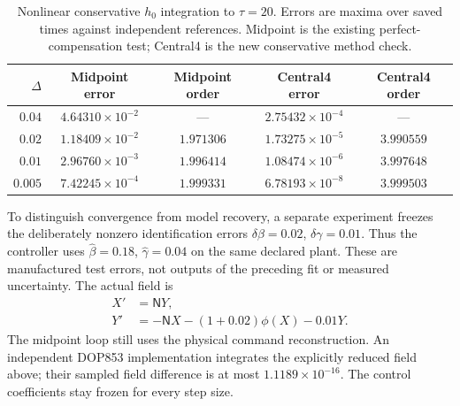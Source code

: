 \begin{table}[t]
\centering
\caption{Nonlinear conservative $h_0$ integration to $\tau=20$. Errors are maxima over saved times against independent references. Midpoint is the existing perfect-compensation test; Central4 is the new conservative method check.}
\label{num:nonlinear-order}
\begin{tabular}{rcccc}
\toprule
$\Delta$ & Midpoint error & Midpoint order & Central4 error & Central4 order\\
\midrule
$0.04$ & $4.64310\times10^{-2}$ & --- & $2.75432\times10^{-4}$ & --- \\
$0.02$ & $1.18409\times10^{-2}$ & $1.971306$ & $1.73275\times10^{-5}$ & $3.990559$ \\
$0.01$ & $2.96760\times10^{-3}$ & $1.996414$ & $1.08474\times10^{-6}$ & $3.997648$ \\
$0.005$ & $7.42245\times10^{-4}$ & $1.999331$ & $6.78193\times10^{-8}$ & $3.999503$ \\
\bottomrule
\end{tabular}
\end{table}

To distinguish convergence from model recovery, a separate experiment
freezes the deliberately nonzero identification errors
$\delta\beta=0.02$, $\delta\gamma=0.01$. Thus the controller uses
$\widehat\beta=0.18$, $\widehat\gamma=0.04$ on the same declared plant.
These are manufactured test errors, not outputs of the preceding fit or
measured uncertainty. The actual field is
\begin{equation}
 \begin{split}
 X'&=\mathsf NY,\\
 Y'&=-\mathsf NX-(1+0.02)\phi(X)-0.01Y.
 \end{split}
 \label{num:fixed-error-field}
\end{equation}
The midpoint loop still uses the physical command reconstruction. An
independent DOP853 implementation integrates the explicitly reduced field
above; their sampled field difference is at most $1.1189\times10^{-16}$.
The control coefficients stay frozen for every step size.

